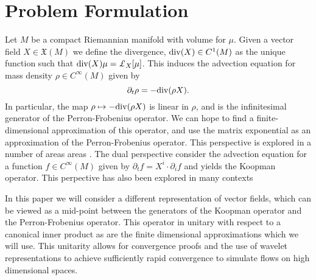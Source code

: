 \section{Problem Formulation}\label{sec:Formulation}
Let $M$ be a compact Riemannian manifold with volume for $\mu$.  Given a vector field $X \in \mathfrak{X}(M)$ we define the divergence, ${\rm div}(X) \in C^1(M)$ as the unique function such that ${\rm div}(X) \mu = \pounds_X [ \mu ]$.
This induces the advection equation for mass density $\rho \in C^{\infty}(M)$ given by
\[
	\partial_t \rho = - {\rm div}( \rho X ).
\]
In particular, the map $\rho \mapsto - {\rm div}( \rho X)$ is linear in $\rho$, and is the infinitesimal generator of the Perron-Frobenius operator.
We can hope to find a finite-dimensional approximation of this operator, and use the matrix exponential as an approximation of the Perron-Frobenius operator.
This perspective is explored in a number of areas areas \cite{FroylandJungeKoltai2013,FroylandPadberg2009}.
The dual perspective consider the advection equation for a function $f \in C^{\infty}(M)$ given by $\partial_t f = X^i \cdot \partial_i f$ and yields the Koopman operator.
This perpective has also been explored in many contexts \cite{RowleyMezic2009,Mezic2005}

In this paper we will consider a different representation of vector fields, which can be viewed as a mid-point between the generators of the Koopman operator and the Perron-Frobenius operator.
This operator in unitary with respect to a canonical inner product as are the finite dimensional approximations which we will use.
This unitarity allows for convergence proofs and the use of wavelet representations to achieve sufficiently rapid convergence to simulate flows on high dimensional spaces.


